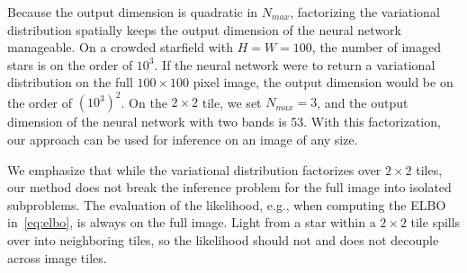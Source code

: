 
Because the output dimension is quadratic in $N_{max}$, factorizing the variational distribution spatially keeps the output dimension of the neural network manageable.
On a crowded starfield with $H = W = 100$, the number of imaged stars is on the order of $10^3$.
If the neural network were to return a variational distribution on the full $100\times 100$ pixel image, the output dimension would be on the order of $(10^3)^2$. 
On the $2\times 2$ tile, we set $N_{max} = 3$, and the output dimension of the neural network with two bands is 53. 
With this factorization, our approach can be used for inference on an image of any size. 


We emphasize that while the variational distribution factorizes over $2 \times 2$ tiles, our method does not break the inference problem for the full image into isolated subproblems. The evaluation of the likelihood, e.g., when computing the ELBO in~\eqref{eq:elbo}, is always on the full image. Light from a star within a $2 \times 2$ tile spills over into neighboring tiles, so the likelihood should not and does not decouple across image tiles. 
